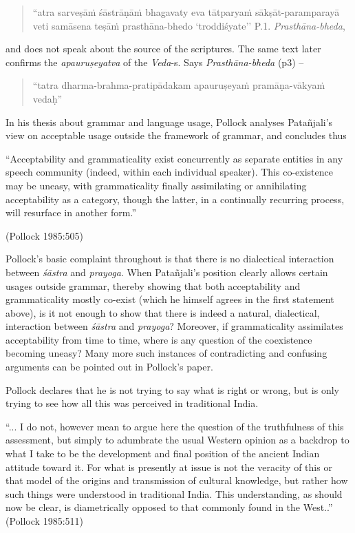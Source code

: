 \begin{quote}
``atra sarveṣāṁ śāstrāṇāṁ bhagavaty eva tātparyaṁ sākṣāt-paramparayā veti samāsena teṣāṁ prasthāna-bhedo `troddiśyate'' P.1. {\sl Prasthāna-bheda}, 
\end{quote}
\noindent
and does not speak about the source of the scriptures. The same text later confirms the {\sl apauruṣeyatva} of the {\sl Veda}-s. Says {\sl Prasthāna-bheda} (p3) -- 

\begin{quote}
``{tatra dharma-brahma-pratipādakam apauruṣeyaṁ pramāṇa-vākyaṁ vedaḥ}'' 
\end{quote}

In his thesis about grammar and language usage, Pollock analyses Patañjali’s view on acceptable usage outside the framework of grammar, and concludes thus
\begin{myquote}
``Acceptability and grammaticality exist concurrently as separate entities in any speech community (indeed, within each individual speaker). This co-existence may be uneasy, with grammaticality finally assimilating or annihilating acceptability as a category, though the latter, in a continually recurring process, will resurface in another form.'' 

\hfill (Pollock 1985:505)
\end{myquote}

Pollock's basic complaint throughout is that there is no dialectical interaction between {\it śāstra} and {\it prayoga}. When Patañjali’s position clearly allows certain usages outside grammar, thereby showing that both acceptability and grammaticality mostly co-exist (which he himself agrees in the first statement above), is it not enough to show that there is indeed a natural, dialectical, interaction between {\it śāstra} and {\it prayoga}? Moreover, if grammaticality assimilates acceptability from time to time, where is any question of the coexistence becoming uneasy? Many more such instances of contradicting and confusing arguments can be pointed out in Pollock's paper.

Pollock declares that he is not trying to say what is right or wrong, but is only trying to see how all this was perceived in traditional India. 
\begin{myquote}
``... I do not, however mean to argue here the question of the truthfulness of this assessment, but simply to adumbrate the usual Western opinion as a backdrop to what I take to be the development and final position of the ancient Indian attitude toward it. For what is presently at issue is not the veracity of this or that model of the origins and transmission of cultural knowledge, but rather how such things were understood in traditional India. This understanding, as should now be clear, is diametrically opposed to that commonly found in the West..'' \hfill (Pollock 1985:511)
\end{myquote}

